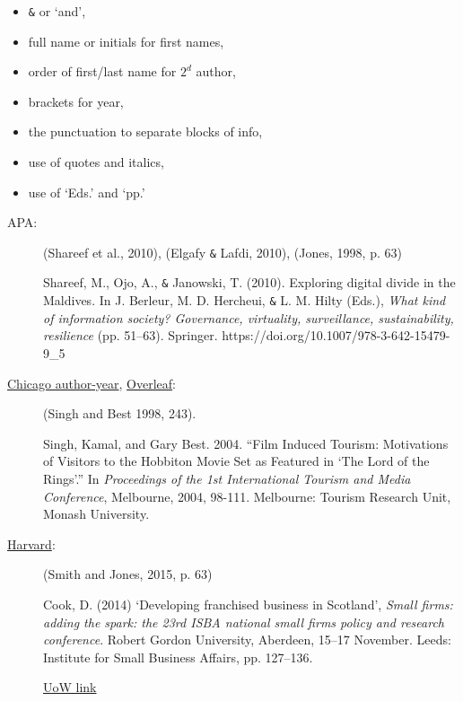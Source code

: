 \documentclass[a4paper,11pt]{article}
\begin{document}
\begin{multicols}{2}
	\begin{itemize}
		\item \verb|&| or `and',
		\item full name or initials for first names,
		\item order of first/last name for $2^d$ author,
		\item brackets for year,
		\item the punctuation to separate blocks of info,
		\item use of quotes and italics,
		\item use of `Eds.' and `pp.'
	\end{itemize}
\end{multicols}

       

\begin{description}
	\item[APA:]	(Shareef et al., 2010), (Elgafy \verb|&| Lafdi, 2010), (Jones, 1998, p. 63)
	
	Shareef, M., Ojo, A., \verb|&| Janowski, T. (2010). Exploring digital divide in the Maldives. In J. Berleur, M. D. Hercheui, \verb|&| L. M. Hilty (Eds.), \textit{What kind of information society? Governance, virtuality, surveillance, sustainability, resilience} (pp. 51–63). Springer. https://doi.org/10.1007/978-3-642-15479-9\_5
	
	\item[\href{https://www.chicagomanualofstyle.org/tools_citationguide/citation-guide-2.html}{Chicago author-year}, \href{https://www.overleaf.com/2121398454pztnvnjshsgk}{Overleaf}:]
	(Singh and Best 1998, 243).
	
	Singh, Kamal, and Gary Best. 2004. ``Film Induced Tourism: Motivations of Visitors to the Hobbiton Movie Set as Featured in `The Lord of the Rings'.'' In \textit{Proceedings of the 1st International Tourism and Media Conference}, Melbourne, 2004, 98-111. Melbourne: Tourism Research Unit, Monash University.
	
	\item[\href{https://www.citethemrightonline.com/comms/conferences/individual-conference-papers}{Harvard}:] (Smith and Jones, 2015, p. 63)
	
	Cook, D. (2014) `Developing franchised business in Scotland', \textit{Small firms: adding the spark: the 23rd ISBA national small firms policy and research conference}. Robert Gordon University, Aberdeen, 15–17 November. Leeds: Institute for Small Business Affairs, pp. 127–136.
	
	\href{https://www.wlv.ac.uk/lib/media/departments/lis/skills/study-guides/LS134-Harvard-Quick-Guide-2018.pdf}{UoW link}
	
\end{description}
\end{document}
